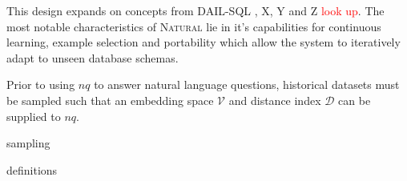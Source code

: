 This design expands on concepts from DAIL-SQL \citep{DAIL}, X, Y and Z \textcolor{red}{look up}.
The most notable characteristics of \textsc{Natural} lie in it's capabilities for continuous
learning, example selection and portability which allow the system to iteratively
adapt to unseen database schemas.

Prior to using $nq$ to answer natural language questions, historical datasets must be sampled
such that an embedding space $\mathcal{V}$ and distance index $\mathcal{D}$ can be supplied
to $nq$.

{sampling}

{definitions}

